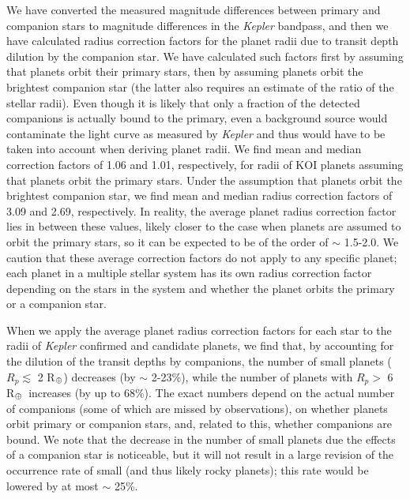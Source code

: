 \documentclass[twocolumn,appendixfloats]{aastex6}
\newcommand{\RE}{R$_{\Earth}$}
\begin{document}
We have converted the measured magnitude differences between primary 
and companion stars to magnitude differences in the {\it Kepler} bandpass, 
and then we have calculated radius correction factors for the planet radii due
to transit depth dilution by the companion star. We have calculated such factors
first by assuming that planets orbit their primary stars, then by assuming 
planets orbit the brightest companion star (the latter also requires an 
estimate of the ratio of the stellar radii). Even though it is likely that only 
a fraction of the detected companions is actually bound to the primary, 
even a background source would contaminate the light curve as measured 
by {\it Kepler} and thus would have to be taken into account when deriving 
planet radii. We find mean and median correction factors of 1.06 and 1.01, 
respectively, for radii of KOI planets assuming that planets orbit the primary 
stars. Under the assumption that planets orbit the brightest companion star, 
we find mean and median radius correction factors of 3.09 and 2.69, 
respectively. In reality, the average planet radius correction factor lies in between 
these values, likely closer to the case when planets are assumed to orbit the
primary stars, so it can be expected to be of the order of $\sim$ 1.5-2.0.
We caution that these average correction factors do not apply to any
specific planet; each planet in a multiple stellar system has its own radius 
correction factor depending on the stars in the system and whether the planet
orbits the primary or a companion star.

When we apply the average planet radius correction factors for each star
to the radii of {\it Kepler} confirmed and candidate planets, we find that, by 
accounting for the dilution of the transit depths by companions, the number of 
small planets ($R_p \lesssim$ 2 \RE) decreases (by $\sim$ 2-23\%), 
while the number of planets with $R_p >$ 6 \RE\ increases (by up to 68\%). 
The exact numbers depend on the actual number of companions (some 
of which are missed by observations), on whether planets orbit primary or 
companion stars, and, related to this, whether companions are bound. 
We note that the decrease in the number of small planets due the 
effects of a companion star is noticeable, but it will not result in a large 
revision of the occurrence rate of small (and thus likely rocky planets); 
this rate would be lowered by at most  $\sim$ 25\%.
\end{document}
